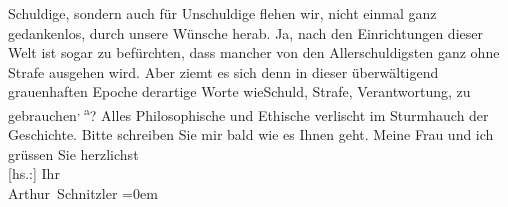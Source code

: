 \begin{ledgroupsized}[t]{13cm}
               Schuldige, sondern auch für Unschuldige flehen wir, nicht einmal ganz gedankenlos,
               durch unsere Wünsche herab. Ja, nach den Einrichtungen dieser Welt ist sogar zu
               befürchten, dass mancher von den Allerschuldigsten ganz ohne Strafe ausgehen wird.
               Aber ziemt es sich \introOben{}denn\introOben{} in dieser überwältigend grauenhaften
               Epoche derartige Worte \introOben{}wie\introOben{}{ }Schuld, Strafe, Verantwortung, zu gebrauchen\substVorne{}\textsuperscript{, a}\substDazwischen{}? A\substHinten{}lles Philosophische und Ethische verlischt im Sturmhauch der Geschichte.\pend
           \pstart
           Bitte schreiben Sie mir bald wie es Ihnen geht. Meine Frau und ich grüssen Sie herzlichst{\\[\baselineskip]}{[}hs.:{]} Ihr{\\[\baselineskip]}\spacefill\mbox{Arthur Schnitzler}\pend
           \leftskip=0em{}
         
         \endnumbering{}\end{ledgroupsized}  \newcommand{\dateiname}{L02199}\newcommand{\titel}{Arthur Schnitzler an Georg Brandes, 20. 10. 1914}\newcommand{\editorInnen}{Martin Anton Müller und Gerd-Hermann Susen}
      